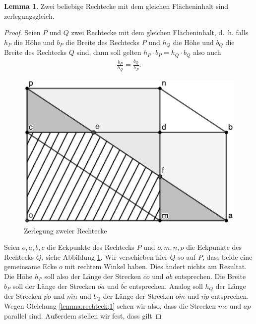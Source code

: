 \documentclass[11pt,titlepage]{article}
\theoremstyle{definition}
\newtheorem{lemma}[theorem]{Lemma}
\theoremstyle{remark}
\begin{document}
	\begin{lemma} \label{lemma:rechtecke}
		Zwei beliebige Rechtecke mit dem gleichen Flächeninhalt sind zerlegungsgleich.
	\end{lemma}
	
	\begin{proof}
		Seien $P$ und $Q$ zwei Rechtecke mit dem gleichen Flächeninhalt, d.~h. falls $h_P$ die Höhe und 
		$b_P$ die Breite des Rechtecks $P$ und $h_Q$ die Höhe und $b_Q$ die Breite des Rechtecks $Q$ sind, 
		dann soll gelten $h_P \cdot b_P = h_Q \cdot b_Q$ also auch
		\begin{align}
			\frac{b_P}{h_Q}=\frac{b_Q}{h_P}. \label{lemma:rechteck;1}
		\end{align}
		\begin{figure}[!htbp]
			\centering
			\includegraphics[scale=1.4]{Rechteck}
			\caption{Zerlegung zweier Rechtecke}
			\label{Abb.2}
		\end{figure}
		Seien $o,a,b,c$ die Eckpunkte des Rechtecks $P$ und $o,m,n,p$ die Eckpunkte des Rechtecks $Q$, siehe 
		Abbildung \ref{Abb.2}. 
		Wir verschieben hier $Q$ so auf $P$, dass beide eine gemeinsame Ecke $o$ mit rechtem Winkel haben. 
		Dies ändert nichts am Resultat. 
		Die Höhe $h_P$ soll also der Länge der Strecken $\overline{co}$ und $\overline{ab}$ entsprechen. Die 
		Breite $b_P$ soll der Länge der Strecken $\overline{oa}$ und $\overline{bc}$ entsprechen. Analog soll 
		$h_Q$ der Länge der Strecken $\overline{po}$ und $\overline{mn}$ und $b_Q$ der Länge der Strecken 
		$\overline{om}$ und $\overline{np}$ entsprechen. Wegen Gleichung  \ref{lemma:rechteck;1} sehen wir also, dass 
		die Strecken $\overline{mc}$ und $\overline{ap}$ parallel sind. Außerdem stellen wir fest, dass gilt

\end{proof}
\end{document}
